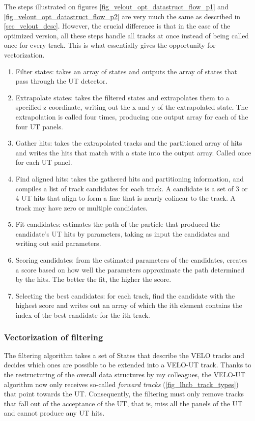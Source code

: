 \documentclass[12pt]{article}
\begin{document}
The steps illustrated on figures \ref{fig_velout_opt_datastruct_flow_p1} and \ref{fig_velout_opt_datastruct_flow_p2} are very much the same as described in \ref{sec_velout_desc}. However, the crucial difference is that in the case of the optimized version, all these steps handle all tracks at once instead of being called once for every track. This is what essentially gives the opportunity for vectorization.

\begin{enumerate}
	\item Filter states: takes an array of states and outputs the array of states that pass through the UT detector.
	\item Extrapolate states: takes the filtered states and extrapolates them to a specified z coordinate, writing out the x and y of the extrapolated state. The extrapolation is called four times, producing one output array for each of the four UT panels.
	\item Gather hits: takes the extrapolated tracks and the partitioned array of hits and writes the hits that match with a state into the output array. Called once for each UT panel.
	\item Find aligned hits: takes the gathered hits and partitioning information, and compiles a list of track candidates for each track. A candidate is a set of 3 or 4 UT hits that align to form a line that is nearly colinear to the track. A track may have zero or multiple candidates.
	\item Fit candidates: estimates the path of the particle that produced the candidate's UT hits by parameters, taking as input the candidates and writing out said parameters.
	\item Scoring candidates: from the estimated parameters of the candidates, creates a score based on how well the parameters approximate the path determined by the hits. The better the fit, the higher the score.
	\item Selecting the best candidates: for each track, find the candidate with the highest score and writes out an array of which the ith element contains the index of the best candidate for the ith track.
\end{enumerate}


\subsubsection{Vectorization of filtering}\label{sec_velout_filtering_vect}

The filtering algorithm takes a set of States that describe the VELO tracks and decides which ones are possible to be extended into a VELO-UT track. Thanks to the restructuring of the overall data structures by my colleagues, the VELO-UT algorithm now only receives so-called \textit{forward tracks} (\ref{fig_lhcb_track_types}) that point towards the UT. Consequently, the filtering must only remove tracks that fall out of the acceptance of the UT, that is, miss all the panels of the UT and cannot produce any UT hits.
\end{document}
